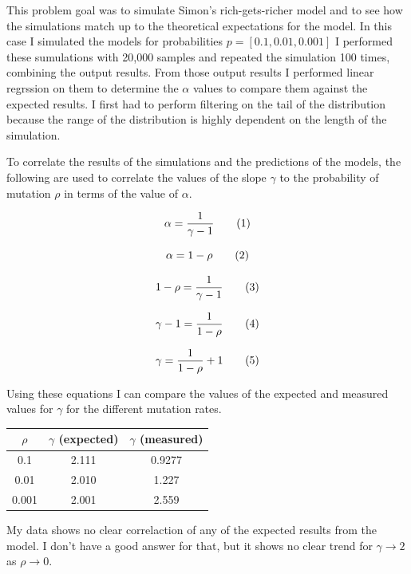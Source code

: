 This problem goal was to simulate Simon's rich-gets-richer model and to see how the simulations match up to the theoretical expectations for the model. In this case I simulated the models for probabilities $p=[0.1, 0.01, 0.001]$ I performed these sumulations with 20,000 samples and repeated the simulation 100 times, combining the output results. From those output results I performed linear regrssion on them to determine the $\alpha$ values to compare them against the expected results. I first had to perform filtering on the tail of the distribution because the range of the distribution is highly dependent on the length of the simulation.

To correlate the results of the simulations and the predictions of the models, the following are used to correlate the values of the slope $\gamma$ to the probability of mutation $\rho$  in terms of the value of $\alpha$.

\[
  \alpha = 
  \frac{1}{\gamma - 1}
  \addtag
\]

\[
  \alpha =
  1 - \rho
  \addtag
\]

\[
  1 - \rho
  =
  \frac{1}{\gamma - 1}
  \addtag
\]

\[
  \gamma - 1
  =
  \frac{1}{1 - \rho}
  \addtag
\]

\[
  \gamma
  =
  \frac{1}{1 - \rho} + 1
  \addtag
\]

Using these equations I can compare the values of the expected and measured values for $\gamma$ for the different mutation rates.

\begin{center}
\begin{tabular}{| c | c | c |}
  \hline
  $\rho$ & $\gamma$ (expected) & $\gamma$ (measured) \\
  \hline
  0.1   & 2.111 & 0.9277 \\
  0.01  & 2.010 & 1.227  \\
  0.001 & 2.001 & 2.559  \\
  \hline
\end{tabular}
\end{center}

My data shows no clear correlaction of any of the expected results from the model. I don't have a good answer for that, but it shows no clear trend for $\gamma \to 2$ as $\rho \to 0$.

